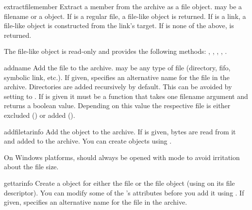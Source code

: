 \begin{methoddesc}{extractfile}{member}
    Extract a member from the archive as a file object.
     may be a filename or a  object.
    If  is a regular file, a file-like object is returned.
    If  is a link, a file-like object is constructed from the
    link's target.
    If  is none of the above,  is returned.
    \begin{notice}
        The file-like object is read-only and provides the following methods:
        , , ,
        , .
    \end{notice}
\end{methoddesc}

\begin{methoddesc}{add}{name}
    Add the file  to the archive.  may be any type
    of file (directory, fifo, symbolic link, etc.).
    If given,  specifies an alternative name for the file in the
    archive. Directories are added recursively by default.
    This can be avoided by setting  to .
    If  is given it must be a function that takes one filename
    argument and returns a boolean value. Depending on this value the
    respective file is either excluded () or added
    ().
\end{methoddesc}

\begin{methoddesc}{addfile}{tarinfo}
    Add the  object  to the archive.
    If  is given,  bytes are read
    from it and added to the archive.  You can create  objects
    using .
    \begin{notice}
    On Windows platforms,  should always be opened with mode
     to avoid irritation about the file size.
    \end{notice}
\end{methoddesc}

\begin{methoddesc}{gettarinfo}{}
    Create a  object for either the file  or
    the file object  (using  on its
    file descriptor).  You can modify some of the 's
    attributes before you add it using .  If given,
     specifies an alternative name for the file in the
    archive.
\end{methoddesc}

